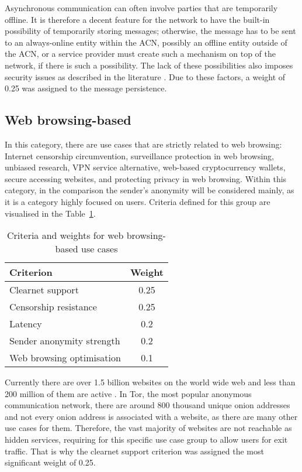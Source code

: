 Asynchronous communication can often involve parties that are temporarily offline. It is therefore a decent feature for the network to have the built-in possibility of temporarily storing messages; otherwise, the message has to be sent to an always-online entity within the ACN, possibly an offline entity outside of the ACN, or a service provider must create such a mechanism on top of the network, if there is such a possibility. The lack of these possibilities also imposes security issues as described in the literature \cite{two-cents-post-office}. Due to these factors, a weight of 0.25 was assigned to the message persistence.

\subsection{Web browsing-based}
In this category, there are use cases that are strictly related to web browsing: Internet censorship circumvention, surveillance protection in web browsing, unbiased research, VPN service alternative, web-based cryptocurrency wallets, secure accessing websites, and protecting privacy in web browsing.
Within this category, in the comparison the sender's anonymity will be considered mainly, as it is a category highly focused on users.
Criteria defined for this group are visualised in the Table~\ref{tab:web_browsing_criteria}.

\begin{table}[!ht]
\centering
\caption{Criteria and weights for web browsing-based use cases}
\begin{tabular}{|l|c|}
\hline
\textbf{Criterion} & \textbf{Weight} \\
\hline
Clearnet support & 0.25 \\
Censorship resistance & 0.25 \\
Latency & 0.2 \\
Sender anonymity strength & 0.2 \\
Web browsing optimisation & 0.1 \\
\hline
\end{tabular}
\label{tab:web_browsing_criteria}
\end{table}

Currently there are over 1.5 billion websites on the world wide web and less than 200 million of them are active \cite{internetlivestats}. In Tor, the most popular anonymous communication network, there are around 800 thousand unique onion addresses \cite{tor-metrics, tor-metrics2} and not every onion address is associated with a website, as there are many other use cases for them. Therefore, the vast majority of websites are not reachable as hidden services, requiring for this specific use case group to allow users for exit traffic. That is why the clearnet support criterion was assigned the most significant weight of 0.25.
    
